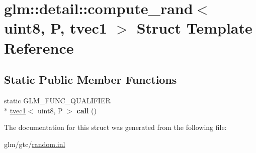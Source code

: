 \hypertarget{structglm_1_1detail_1_1compute__rand_3_01uint8_00_01P_00_01tvec1_01_4}{\section{glm\-:\-:detail\-:\-:compute\-\_\-rand$<$ uint8, P, tvec1 $>$ Struct Template Reference}
\label{structglm_1_1detail_1_1compute__rand_3_01uint8_00_01P_00_01tvec1_01_4}
}
\subsection*{Static Public Member Functions}
\begin{DoxyCompactItemize}
\item 
\hypertarget{structglm_1_1detail_1_1compute__rand_3_01uint8_00_01P_00_01tvec1_01_4_abdfb11bac3bebc1ea1a6a77445291fd0}{static G\-L\-M\-\_\-\-F\-U\-N\-C\-\_\-\-Q\-U\-A\-L\-I\-F\-I\-E\-R \\*
\hyperlink{structglm_1_1tvec1}{tvec1}$<$ uint8, P $>$ {\bfseries call} ()}\label{structglm_1_1detail_1_1compute__rand_3_01uint8_00_01P_00_01tvec1_01_4_abdfb11bac3bebc1ea1a6a77445291fd0}

\end{DoxyCompactItemize}


The documentation for this struct was generated from the following file\-:\begin{DoxyCompactItemize}
\item 
glm/gtc/\hyperlink{random_8inl}{random.\-inl}\end{DoxyCompactItemize}
